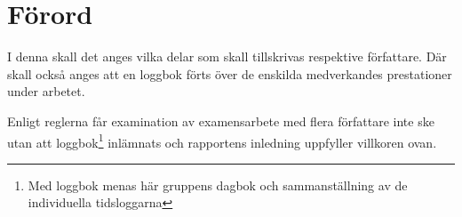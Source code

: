 \documentclass[../rapport_MVEX01-11-05]{subfiles}
\begin{document}
\section*{Förord}
I denna skall det anges vilka delar som skall tillskrivas respektive
författare. Där skall också anges att en loggbok förts över de
enskilda medverkandes prestationer under arbetet.

Enligt reglerna får examination av examensarbete med flera författare
inte ske utan att loggbok\footnote{Med loggbok menas här gruppens
dagbok och sammanställning av de individuella tidsloggarna} inlämnats
och rapportens inledning uppfyller villkoren ovan.
\end{document}
